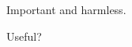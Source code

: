 \begin{tdocimportant}
    Important and harmless.
\end{tdocimportant}

\begin{tdocimportant}
    Useful?
\end{tdocimportant}
